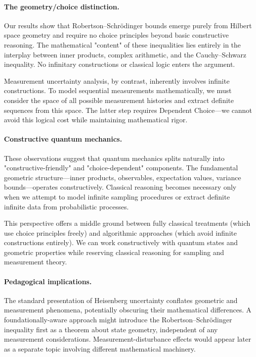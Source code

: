 \documentclass[11pt]{article}
\theoremstyle{plain}
\theoremstyle{definition}
\theoremstyle{remark}
\begin{document}
\paragraph{The geometry/choice distinction.}
Our results show that Robertson--Schrödinger bounds emerge purely from Hilbert space geometry and require no choice principles beyond basic constructive reasoning. The mathematical "content" of these inequalities lies entirely in the interplay between inner products, complex arithmetic, and the Cauchy--Schwarz inequality. No infinitary constructions or classical logic enters the argument.

Measurement uncertainty analysis, by contrast, inherently involves infinite constructions. To model sequential measurements mathematically, we must consider the space of all possible measurement histories and extract definite sequences from this space. The latter step requires Dependent Choice---we cannot avoid this logical cost while maintaining mathematical rigor.

\paragraph{Constructive quantum mechanics.}
These observations suggest that quantum mechanics splits naturally into "constructive-friendly" and "choice-dependent" components. The fundamental geometric structure---inner products, observables, expectation values, variance bounds---operates constructively. Classical reasoning becomes necessary only when we attempt to model infinite sampling procedures or extract definite infinite data from probabilistic processes.

This perspective offers a middle ground between fully classical treatments (which use choice principles freely) and algorithmic approaches (which avoid infinite constructions entirely). We can work constructively with quantum states and geometric properties while reserving classical reasoning for sampling and measurement theory.

\paragraph{Pedagogical implications.}
The standard presentation of Heisenberg uncertainty conflates geometric and measurement phenomena, potentially obscuring their mathematical differences. A foundationally-aware approach might introduce the Robertson--Schrödinger inequality first as a theorem about state geometry, independent of any measurement considerations. Measurement-disturbance effects would appear later as a separate topic involving different mathematical machinery.
\end{document}
